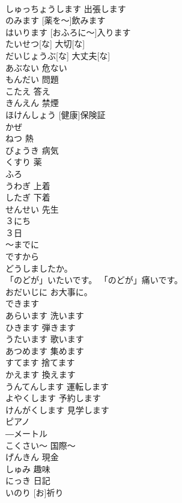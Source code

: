 \documentclass[8pt]{extreport}
\begin{document}
\begin{CJK}{UTF8}{min}
\\	しゅっちょうします	出張します	
\\	[くすりを～]のみます	[薬を～]飲みます	
\\	[おふろに～]はいります	[おふろに～]入ります	
\\	たいせつ[な]	大切[な]	
\\	だいじょうぶ[な]	大丈夫[な]	
\\	あぶない	危ない	
\\	もんだい	問題	
\\	こたえ	答え	
\\	きんえん	禁煙	
\\	[けんこう]ほけんしょう	[健康]保険証	
\\	かぜ			
\\	ねつ	熱	
\\	びょうき	病気	
\\	くすり	薬	
\\	[お]ふろ			
\\	うわぎ	上着	
\\	したぎ	下着	
\\	せんせい	先生	
\\	３にち	
\\	３日	
\\	～までに			
\\	ですから			
\\	どうしましたか。			
\\	「のどが」いたいです。	「のどが」痛いです。	
\\	おだいじに	お大事に。	
\\	できます			
\\	あらいます	洗います	
\\	ひきます	弾きます	
\\	うたいます	歌います	
\\	あつめます	集めます	
\\	すてます	捨てます	
\\	かえます	換えます	
\\	うんてんします	運転します	
\\	よやくします	予約します	
\\	けんがくします	見学します	
\\	ピアノ			
\\	―メートル			
\\	こくさい～	国際～	
\\	げんきん	現金	
\\	しゅみ	趣味	
\\	にっき	日記	
\\	[お]いのり	[お]祈り	

\end{CJK}
\end{document}
